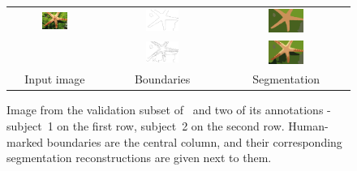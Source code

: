 \begin{figure}[ht!]
\begin{center}
  \begin{tabular}{ c  c  c }
  \includegraphics[width=0.3\textwidth]{images/examples/starfish/starfish.png} &
  \includegraphics[width=0.3\textwidth,frame]{images/examples/starfish/starfish_bdry_coarse.png} &
  \includegraphics[width=0.3\textwidth]{images/examples/starfish/starfish_segm_coarse.png} \\
  &
  \includegraphics[width=0.3\textwidth,frame]{images/examples/starfish/starfish_bdry_detail.png} &
  \includegraphics[width=0.3\textwidth]{images/examples/starfish/starfish_segm_detail.png} \\
  Input image & Boundaries & Segmentation \\
  \end{tabular}
\end{center}
\caption{Image from the validation subset of~\cite{BSDS500resources} and two of its annotations - subject~1 on the first row, subject~2 on the second row. Human-marked boundaries are the central column, and their corresponding segmentation reconstructions are given next to them.}
\end{figure}

